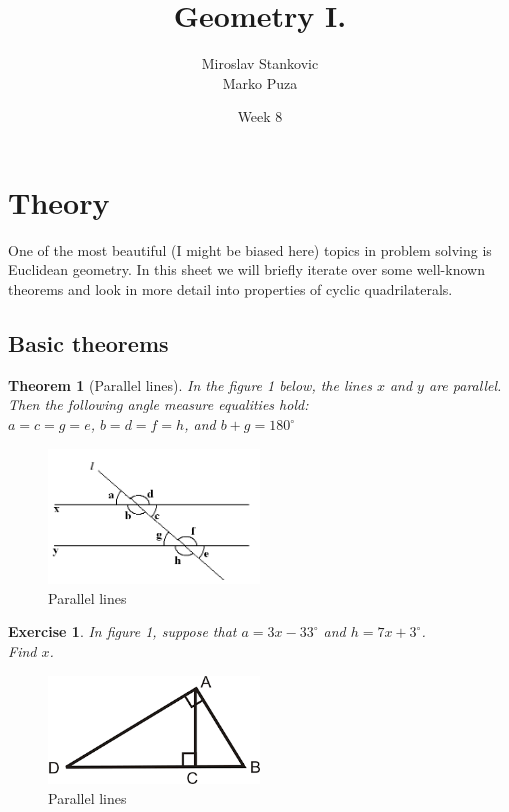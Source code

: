 \documentclass[11pt,a5paper]{article}
\title{\textbf{Geometry I.}}
\date{Week 8}
\author{Miroslav Stankovic\\ Marko Puza}
\newtheorem{exercise}{Exercise}
\newtheorem*{Theorem}{Theorem}
\begin{document}
\maketitle

\section{Theory}

\noindent One of the most beautiful (I might be biased here) topics in problem solving is Euclidean geometry. In this sheet we will briefly iterate over some well-known theorems and look in more detail into properties of cyclic quadrilaterals.

\subsection*{Basic theorems}

\begin{Theorem}[Parallel lines]
	In the figure 1 below, the lines $x$ and $y$ are parallel. Then the following angle measure equalities hold: \\ $a = c = g = e$, $b = d = f = h$, and $b + g = 180^{\circ}$
\end{Theorem}

\begin{figure}[h] \begin{center}
\includegraphics[width=0.5\textwidth]{parallel}
\caption{Parallel lines}
\end{center} \end{figure}

\begin{exercise} In figure 1, suppose that $a=3x-33^{\circ}$ and $h=7x+3^{\circ}$. \\ Find $x$.
\end{exercise}


\begin{figure}[h] \begin{center}
\includegraphics[width=0.5\textwidth]{right}
\caption{Parallel lines}
\end{center} \end{figure}
\end{document}
